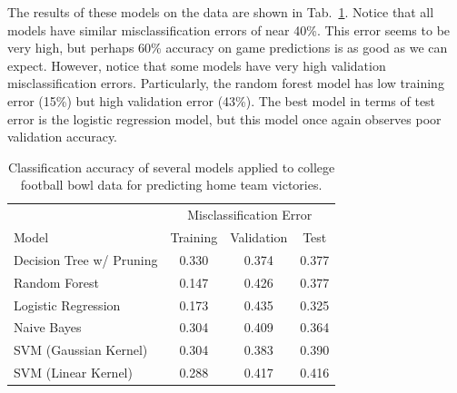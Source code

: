 \documentclass[12pt]{article}
\begin{document}
The results of these models on the data are shown in Tab.~\ref{tab::try_1}. Notice that all models have similar misclassification errors of near 40\%. This error seems to be very high, but perhaps 60\% accuracy on game predictions is as good as we can expect. However, notice that some models have very high validation misclassification errors. Particularly, the random forest model has low training error (15\%) but  high validation error (43\%). The best model in terms of test error is the logistic regression model, but this model once again observes poor validation accuracy.

\begin{table}[ht!]
	\begin{center}
		\caption{Classification accuracy of several models applied to college football bowl data for predicting home team victories.}
		\label{tab::try_1}
		\begin{tabular}{l|ccc}
			\hline
			& \multicolumn{3}{c}{Misclassification Error} \\
			Model & Training & Validation & Test \\
			\hline
			Decision Tree w/ Pruning & 0.330 & 0.374 & 0.377\\
			Random Forest & 0.147 & 0.426 & 0.377\\
			Logistic Regression & 0.173 & 0.435 & 0.325\\
			Naive Bayes & 0.304 & 0.409 & 0.364\\
			SVM (Gaussian Kernel) & 0.304 & 0.383 & 0.390\\
			SVM (Linear Kernel) & 0.288 & 0.417 & 0.416\\
			\hline
		\end{tabular}
	\end{center}
\end{table}
\end{document}
